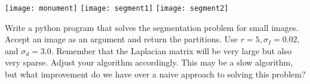 \begin{center}
\texttt{[image: monument]}
\texttt{[image: segment1]}
\texttt{[image: segment2]}
\end{center}

\begin{problem}  Write a python program that solves the segmentation problem for small images.  Accept an image as an argument and return the partitions. Use $r = 5, \sigma_I = 0.02,$ and $\sigma_d = 3.0$. Remember that the Laplacian matrix will be very large but also very sparse.  Adjust your algorithm accordingly.  This may be a slow algorithm, but what improvement do we have over a naive approach to solving this problem?
\end{problem}



